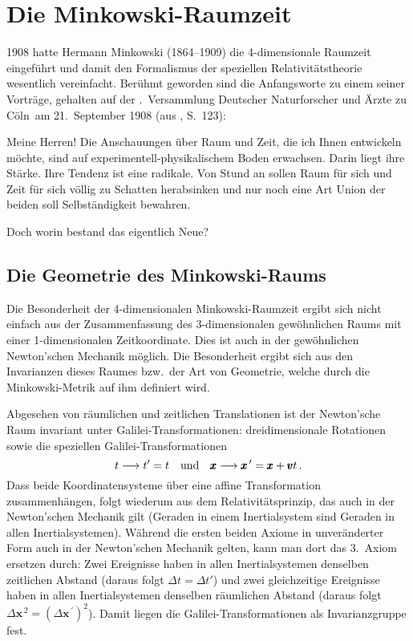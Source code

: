 \section{Die Minkowski-Raumzeit}

1908 hatte Hermann Minkowski (1864--1909) die 4-dimensionale Raumzeit 
eingef\"uhrt und damit den Formalismus der speziellen Relativit\"atstheorie 
wesentlich vereinfacht. Ber\"uhmt geworden sind die Anfangsworte zu
einem seiner Vortr\"age,  
gehalten auf der .\ Versammlung Deutscher 
Naturforscher und \"Arzte zu C\"oln\grqq\ am 21.\ September 1908 (aus
\cite{Aichelburg}, S.~123):
\vspace{0.3cm}

{\small
Meine Herren! Die Anschauungen \"uber Raum und Zeit, die ich Ihnen
entwickeln m\"ochte, sind auf experimentell-physikalischem Boden
erwachsen. Darin liegt ihre St\"arke. Ihre Tendenz ist eine radikale.
Von Stund an sollen Raum f\"ur sich und Zeit f\"ur sich v\"ollig zu
Schatten herabsinken und nur noch eine Art Union der beiden soll
Selbst\"andigkeit bewahren.}
\vspace{0.1cm}

Doch worin bestand das eigentlich Neue?

\subsection{Die Geometrie des Minkowski-Raums}

Die Besonderheit der 4-dimensionalen Minkowski-Raumzeit
ergibt sich nicht einfach aus der Zusammenfassung des
3-dimensionalen gew\"ohnlichen Raums mit einer 1-dimensionalen
Zeitkoordinate. Dies ist auch in der gew\"ohnlichen
Newton'schen Mechanik m\"oglich. Die Besonderheit
ergibt sich aus den Invarianzen dieses Raumes bzw.\ der
Art von Geometrie, welche durch die Minkowski-Metrik
auf ihm definiert wird. 

Abgesehen von r\"aumlichen und zeitlichen Translationen
ist der Newton'sche Raum
invariant unter Galilei-Transformationen: dreidimensionale
Rotationen sowie die speziellen Galilei-Transformationen
\begin{equation}
     t \longrightarrow t'=t ~~~ {\rm und} ~~~ 
     \pmb{x} \longrightarrow  \pmb{x}^{\,\prime}= \pmb{x} + \pmb{v} t  \, .
\end{equation}
Dass beide Koordinatensysteme \"uber eine affine
Transformation zusammenh\"angen, folgt
wiederum aus dem Relativit\"atsprinzip,
das auch in der Newton'schen Mechanik gilt (Geraden in
einem Inertialsystem sind Geraden in allen Inertialsystemen).
W\"ahrend die ersten beiden Axiome in unver\"anderter
Form auch in der Newton'schen Mechanik gelten,
kann man dort das 3.\
Axiom ersetzen durch: Zwei Ereignisse haben in
allen Inertialsystemen denselben zeitlichen Abstand
(daraus folgt $\Delta t=\Delta t'$) und zwei gleichzeitige
Ereignisse haben in allen Inertialsystemen denselben
r\"aumlichen Abstand (daraus 
folgt $\Delta \pmb{x}^{\,2} = (\Delta \pmb{x}^{\,\prime})^2$). Damit liegen
die Galilei-Transformationen als Invarianzgruppe
fest. 


